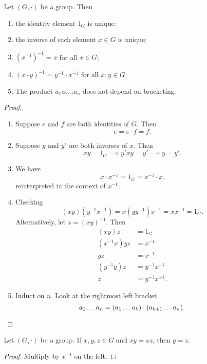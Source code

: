 \begin{proposition}
    Let $(G, \cdot)$ be a group. Then
    \begin{enumerate}
        \item the identity element $1_G$ is unique;
        \item the inverse of each element $x \in G$ is unique;
        \item $(x^{-1})^{-1} = x$ for all $x \in G$;
        \item $(x \cdot y)^{-1} = y^{-1} \cdot x^{-1}$ for all $x, y \in G$;
        \item The product $a_1 a_2 \dots a_n$ does not depend on bracketing.
    \end{enumerate}
\end{proposition}
\begin{proof} \leavevmode
    \begin{enumerate}
        \item Suppose $e$ and $f$ are both identities of $G$.
            Then \[
                e = e \cdot f = f.
            \]
        \item Suppose $y$ and $y'$ are both inverses of $x$.
            Then \[
                xy = 1_G \implies y'xy = y' \implies y = y'.
            \]
        \item We have \[
            x \cdot x^{-1} = 1_G = x^{-1} \cdot x.
        \] reinterpreted in the context of $x^{-1}$.
        \item Checking \[
            (xy)(y^{-1}x^{-1}) = x(y y^{-1})x^{-1} = xx^{-1} = 1_G.
        \] Alternatively, let $z = (xy)^{-1}$.
        Then \begin{align*}
            (xy)z &= 1_G \\
            (x^{-1}x)yz &= x^{-1} \\
            yz &= x^{-1} \\
            (y^{-1}y)z &= y^{-1}x^{-1} \\
            z &= y^{-1}x^{-1}.
        \end{align*}
        \item Induct on $n$.
        Look at the rightmost left bracket \[
            a_1 \dots a_n = (a_1 \dots a_k) \cdot (a_{k+1} \dots a_n).
                \qedhere %
        \]
    \end{enumerate}
\end{proof}

\begin{corollary} \label{thm:group:cancel}
    Let $(G, \cdot)$ be a group.
    If $x, y, z \in G$ and $xy = xz$, then $y = z$.
\end{corollary}
\begin{proof}
    Multiply by $x^{-1}$ on the left.
\end{proof}
